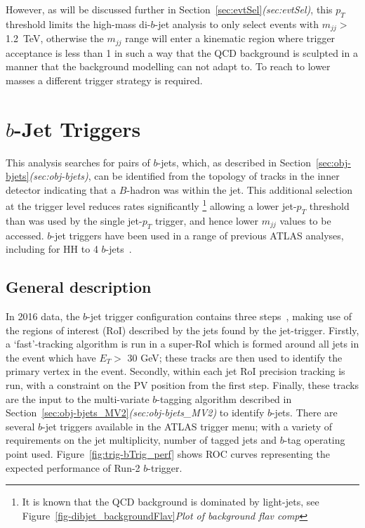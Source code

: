 However, as will be discussed further in Section~\ref{sec:evtSel}\textit{(sec:evtSel)},
this $p_T$ threshold limits the high-mass di-$b$-jet analysis to only select events with $m_{jj} >$ 1.2~TeV,
otherwise the $m_{jj}$ range will enter a kinematic region where
trigger acceptance is less than 1 in such a way that the QCD background is sculpted
in a manner that the background modelling can not adapt to.
To reach to lower masses a different trigger strategy is required.

\section{$b$-Jet Triggers}
\label{sec:trig-bjet}

This analysis searches for pairs of $b$-jets,
which, as described in Section~\ref{sec:obj-bjets}\textit{(sec:obj-bjets)},
can be identified from the topology of tracks in the inner detector indicating that a $B$-hadron was within the jet.
This additional selection at the trigger level reduces rates significantly
\footnote{It is known that the QCD background is dominated by light-jets, see Figure~\ref{fig-dibjet_backgroundFlav}\textit{Plot of background flav comp}}
allowing a lower jet-$p_T$ threshold than was used by the single jet-$p_T$ trigger, and hence lower $m_{jj}$ values to be accessed.
$b$-jet triggers have been used in a range of previous ATLAS analyses,
including for HH to 4 $b$-jets~\cite{trig-H4b}.

\subsection{General description}

In 2016 data, the $b$-jet trigger configuration contains three steps~\cite{trig-bTrig_desc},
making use of the regions of interest (RoI) described by the jets found by the jet-trigger.
Firstly, a `fast'-tracking algorithm is run in a super-RoI
which is formed around all jets in the event which have $E_T >$ 30 GeV;
these tracks are then used to identify the primary vertex in the event.
Secondly, within each jet RoI precision tracking is run, with a constraint on the PV position from the first step.
Finally, these tracks are the input to the multi-variate $b$-tagging algorithm described in
Section~\ref{sec:obj-bjets_MV2}\textit{(sec:obj-bjets\_MV2)} to identify $b$-jets.
There are several $b$-jet triggers available in the ATLAS trigger menu;
with a variety of requirements on the jet multiplicity, number of tagged jets and $b$-tag operating point used.
Figure~\ref{fig:trig-bTrig_perf} shows ROC curves representing the expected performance of Run-2 $b$-trigger.


